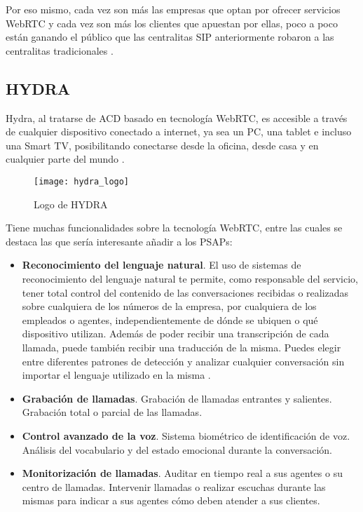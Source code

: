 Por eso mismo, cada vez son más las empresas que optan por ofrecer servicios WebRTC y cada vez son más los clientes que apuestan por ellas, poco a poco están ganando el público que las centralitas SIP anteriormente robaron a las centralitas tradicionales \cite{webrtc1}.

\subsection{HYDRA}

Hydra, al tratarse de ACD basado en tecnología WebRTC, es accesible a través de cualquier dispositivo conectado a internet, ya sea un PC, una tablet e incluso una Smart TV, posibilitando conectarse desde la oficina, desde casa y en cualquier parte del mundo \cite{webrtc4}.

\begin{figure}[htp!]
  \centering
  \texttt{[image: hydra\_logo]}
  \caption{Logo de HYDRA}
  \label{fig:hydra_logo}
\end{figure}

Tiene muchas funcionalidades sobre la tecnología WebRTC, entre las cuales se destaca las que sería interesante añadir a los PSAPs:

\begin{itemize}
  \item \textbf{Reconocimiento del lenguaje natural}. El uso de sistemas de reconocimiento del lenguaje natural te permite, como responsable del servicio, tener total control del contenido de las conversaciones recibidas o realizadas sobre cualquiera de los números de la empresa, por cualquiera de los empleados o agentes, independientemente de dónde se ubiquen o qué dispositivo utilizan. Además de poder recibir una transcripción de cada llamada, puede también recibir una traducción de la misma. Puedes elegir entre diferentes patrones de detección y analizar cualquier conversación sin importar el lenguaje utilizado en la misma \cite{webrtc4}.
  \item \textbf{Grabación de llamadas}. Grabación de llamadas entrantes y salientes. Grabación total o parcial de las llamadas.
  \item \textbf{Control avanzado de la voz}. Sistema biométrico de identificación de voz. Análisis del vocabulario y del estado emocional durante la conversación.
  \item \textbf{Monitorización de llamadas}. Auditar en tiempo real a sus agentes o su centro de llamadas. Intervenir llamadas o realizar escuchas durante las mismas para indicar a sus agentes cómo deben atender a sus clientes.
\end{itemize}

